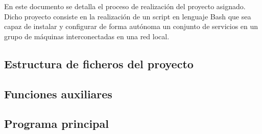 En este documento se detalla el proceso de realización del proyecto asignado. Dicho proyecto consiste en la realización de un script en lenguaje Bash que sea capaz de instalar y configurar de forma autónoma un conjunto de servicios en un grupo de máquinas interconectadas en una red local.

\subsection{Estructura de ficheros del proyecto}


\subsection{Funciones auxiliares}


\subsection{Programa principal}
